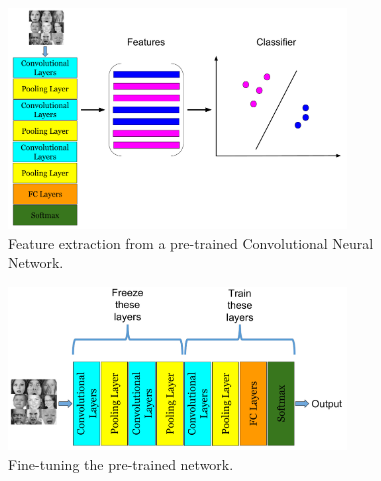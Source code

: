 \begin{figure}[]
    \begin{center}
    \includegraphics[width=0.8\textwidth]{images/VGG16_transfer_learning_feature_extractor.pdf}
    \end{center}
    \caption{Feature extraction from a pre-trained Convolutional Neural Network.} \label{fig:VGG16_transfer_learning_feature_extractor}
\end{figure}

\begin{figure}[]
    \begin{center}
    \includegraphics[width=0.8\textwidth]{images/VGG16_transfer_learning_finetuning.pdf}
    \end{center}
    \caption{Fine-tuning the pre-trained network.} \label{fig:VGG16_transfer_learning_finetuning}
\end{figure}


